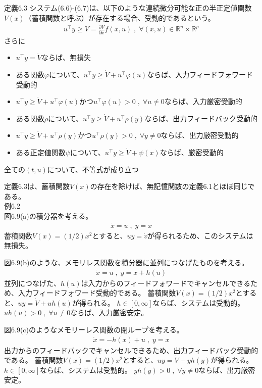 \documentclass{jsarticle}
\begin{document}
\begin{itembox}[l]{定義6.3}
  システム(6.6)-(6.7)は、以下のような連続微分可能な正の半正定値関数$V (x)$（蓄積関数と呼ぶ）が存在する場合、受動的であるという。
  \begin{align}
    u^\top y \geq \dot V = \frac{\partial V}{\partial x}f(x,u)\;,\;\forall (x,u)\in \mathbb R^n \times \mathbb R^p
  \end{align}
  さらに 
  \begin{itemize}
    \item $u^\top y = \dot V$ならば、無損失
    \item ある関数$\varphi$について、$u^\top y \geq \dot V + u^\top \varphi(u)$ならば、入力フィードフォワード受動的
    \item $u^\top y \geq \dot V + u^\top \varphi(u)$かつ$u^\top \varphi(u)>0\;,\;\forall u\neq 0$ならば、入力厳密受動的
    \item ある関数$\rho$について、$u^\top y \geq \dot V + u^\top \rho(y)$ならば、出力フィードバック受動的
    \item $u^\top y \geq \dot V + u^\top \rho(y)$かつ$u^\top \rho(y)>0\;,\;\forall y\neq 0$ならば、出力厳密受動的
    \item ある正定値関数$\psi$について、$u^\top y \geq \dot V + \psi(x)$ならば、厳密受動的
  \end{itemize}
  全ての$(t,u)$について、不等式が成り立つ
\end{itembox}

定義6.3は、蓄積関数$V(x)$の存在を除けば、無記憶関数の定義6.1とほぼ同じである。\\

例6.2\\
図6.9(a)の積分器を考える。
\begin{align}
  \dot x = u \;,\; y=x
\end{align}
蓄積関数$V(x) = (1/2)x^2$とすると、$uy=\dot v$が得られるため、このシステムは無損失。

図6.9(b)のような、メモリレス関数を積分器に並列につなげたものを考える。
\begin{align}
  \dot x = u \;,\; y = x+h(u)
\end{align}
並列につなげた、$h(u)$は入力からのフィードフォワードでキャンセルできるため、入力フィードフォワード受動的である。
蓄積関数$V(x) = (1/2)x^2$とすると、$uy=\dot V +uh(u)$が得られる。
$h\in [0,\infty]$ならば、システムは受動的。
$uh(u)>0 \;,\;\forall u\neq 0$ならば、入力厳密安定。

図6.9(c)のようなメモリーレス関数の閉ループを考える。
\begin{align}
  \dot x = -h(x) + u \;,\; y = x
\end{align}
出力からのフィードバックでキャンセルできるため、出力フィードバック受動的である。
蓄積関数$V(x) = (1/2)x^2$とすると、$uy=\dot V +yh(y)$が得られる。
$h\in [0,\infty]$ならば、システムは受動的。
$yh(y)>0 \;,\;\forall y\neq 0$ならば、出力厳密安定。
\end{document}
